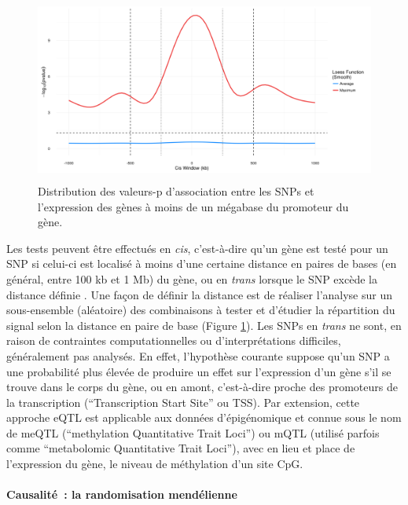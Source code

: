 \documentclass[11pt,a4paper,notrimn]{krantz}
\let\oldparagraph\paragraph
\renewcommand{\paragraph}[1]{\oldparagraph{#1}\mbox{}}
\theoremstyle{definition}
\theoremstyle{definition}
\theoremstyle{remark}
\begin{document}
\begin{figure}[!htb]

{\centering \includegraphics[width=4.8in,height=2.4in]{FiguresTables/eQTL} 

}

\caption{Distribution des valeurs-p d'association entre les SNPs et
l'expression des gènes à moins de un mégabase du promoteur du gène.}\label{fig:eQTL}
\end{figure}

Les tests peuvent être effectués en \emph{cis}, c'est-à-dire qu'un gène
est testé pour un SNP si celui-ci est localisé à moins d'une certaine
distance en paires de bases (en général, entre 100 kb et 1 Mb) du gène,
ou en \emph{trans} lorsque le SNP excède la distance définie
\citep{rockman_genetics_2006, cheung_genetics_2009}. Une façon de
définir la distance est de réaliser l'analyse sur un sous-ensemble
(aléatoire) des combinaisons à tester et d'étudier la répartition du
signal selon la distance en paire de base (Figure \ref{fig:eQTL}). Les
SNPs en \emph{trans} ne sont, en raison de contraintes computationnelles
ou d'interprétations difficiles, généralement pas analysés. En effet,
l'hypothèse courante suppose qu'un SNP a une probabilité plus élevée de
produire un effet sur l'expression d'un gène s'il se trouve dans le
corps du gène, ou en amont, c'est-à-dire proche des promoteurs de la
transcription (``Transcription Start Site'' ou TSS). Par extension,
cette approche eQTL est applicable aux données d'épigénomique et connue
sous le nom de meQTL (``methylation Quantitative Trait Loci'') ou mQTL
(utilisé parfois comme ``metabolomic Quantitative Trait Loci''), avec en
lieu et place de l'expression du gène, le niveau de méthylation d'un
site CpG.

\paragraph{Causalité~: la randomisation
mendélienne}\label{causalite-la-randomisation-mendelienne}
\end{document}
